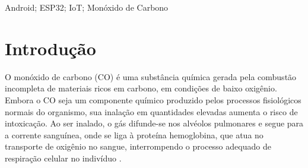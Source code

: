 \documentclass[alpha-refs,brazilian]{RBCA_v3.0}
\begin{document}
\begin{frontmatter}
\begin{palavras_chave} %
	Android; ESP32; IoT; Monóxido de Carbono
\end{palavras_chave}

\end{frontmatter}

\section{Introdução}

O monóxido de carbono (CO) é uma substância química gerada pela combustão incompleta de materiais ricos em carbono, em condições de baixo oxigênio. 
Embora o CO seja um componente químico produzido pelos processos fisiológicos normais do organismo, sua inalação em quantidades elevadas aumenta o 
risco de intoxicação. Ao ser inalado, o gás difunde-se nos alvéolos pulmonares e segue para a corrente sanguínea, onde se liga à proteína hemoglobina, 
que atua no transporte de oxigênio no sangue, interrompendo o processo adequado de respiração celular no indivíduo \citep{gases-sufocantes-hernandez-2022}.


 
\end{document}
